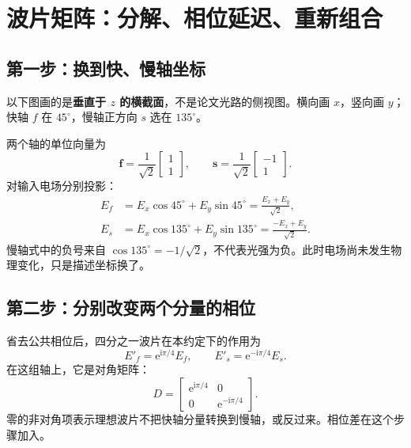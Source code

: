 \documentclass[UTF8,fontset=fandol,11pt,a4paper]{ctexart}
\newcommand{\ii}{\mathrm i}
\newcommand{\ee}{\mathrm e}
\newcommand{\colvec}[2]{\begin{bmatrix}#1\\#2\end{bmatrix}}
\begin{document}
\clearpage
\section{波片矩阵：分解、相位延迟、重新组合}
\subsection{第一步：换到快、慢轴坐标}
以下图画的是\textbf{垂直于 $z$ 的横截面}，不是论文光路的侧视图。横向画 $x$，竖向画 $y$；快轴 $f$ 在 $45^\circ$，慢轴正方向 $s$ 选在 $135^\circ$。
\begin{center}
\end{center}
两个轴的单位向量为
\begin{equation}
\mathbf f=\frac1{\sqrt2}\colvec{1}{1},\qquad
\mathbf s=\frac1{\sqrt2}\colvec{-1}{1}.
\end{equation}
对输入电场分别投影：
\begin{align}
E_f&=E_x\cos45^\circ+E_y\sin45^\circ
=\frac{E_x+E_y}{\sqrt2},\\
E_s&=E_x\cos135^\circ+E_y\sin135^\circ
=\frac{-E_x+E_y}{\sqrt2}.
\end{align}
慢轴式中的负号来自 $\cos135^\circ=-1/\sqrt2$，不代表光强为负。此时电场尚未发生物理变化，只是描述坐标换了。

\subsection{第二步：分别改变两个分量的相位}
省去公共相位后，四分之一波片在本约定下的作用为
\begin{equation}
E'_f=\ee^{\ii\pi/4}E_f,
\qquad E'_s=\ee^{-\ii\pi/4}E_s.
\end{equation}
在这组轴上，它是对角矩阵：
\begin{equation}
D=\begin{bmatrix}\ee^{\ii\pi/4}&0\\0&\ee^{-\ii\pi/4}\end{bmatrix}.
\end{equation}
零的非对角项表示理想波片不把快轴分量转换到慢轴，或反过来。相位差在这个步骤加入。
\end{document}
